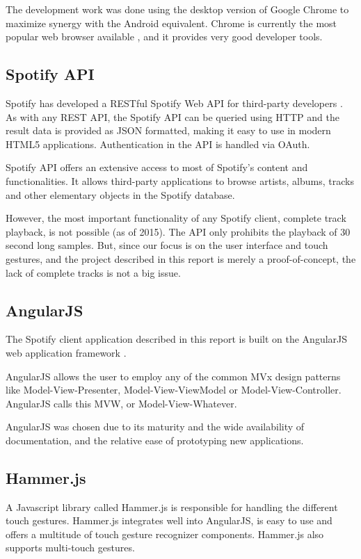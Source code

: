 \documentclass[conference]{IEEEtran}
\begin{document}
The development work was done using the desktop version of Google Chrome to maximize synergy with the Android equivalent. Chrome is currently the most popular web browser available \cite{W3Counter}, and it provides very good developer tools.

\subsection{Spotify API}

Spotify has developed a RESTful Spotify Web API for third-party developers \cite{SpotifyAPI}. As with any REST API, the Spotify API can be queried using HTTP and the result data is provided as JSON formatted, making it easy to use in modern HTML5 applications. Authentication in the API is handled via OAuth.

Spotify API offers an extensive access to most of Spotify's content and functionalities. It allows third-party applications to browse artists, albums, tracks and other elementary objects in the Spotify database. 

However, the most important functionality of any Spotify client, complete track playback, is not possible (as of 2015). The API only prohibits the playback of 30 second long samples. But, since our focus is on the user interface and touch gestures, and the project described in this report is merely a proof-of-concept, the lack of complete tracks is not a big issue.

\subsection{AngularJS}
The Spotify client application described in this report is built on the AngularJS web application framework \cite{AngularJS}.

AngularJS allows the user to employ any of the common MVx design patterns like Model-View-Presenter, Model-View-ViewModel or Model-View-Controller.
AngularJS calls this MVW, or Model-View-Whatever.

AngularJS was chosen due to its maturity and the wide availability of documentation, and the relative ease of prototyping new applications.

\subsection{Hammer.js}
A Javascript library called Hammer.js is responsible for handling the different touch gestures.
Hammer.js integrates well into AngularJS, is easy to use and offers a multitude of touch gesture recognizer components.
Hammer.js also supports multi-touch gestures.
\cite{HammerJS}
\end{document}
